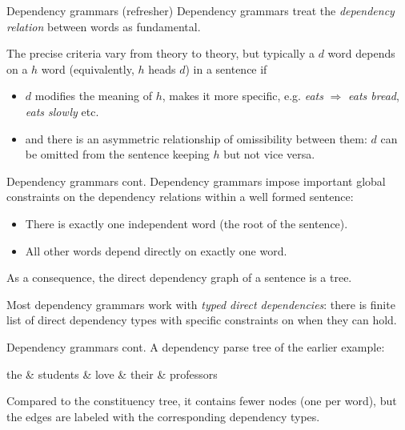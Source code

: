 \documentclass[style=upen, size=14pt]{powerdot}
\newcommand{\gold}{\color{arany}}
\theoremstyle{definition}
\begin{document}
\begin{slide}[toc={Dep. grammars}]{Dependency grammars (refresher)}
  Dependency grammars treat the \emph{\gold dependency relation}
  between words as fundamental.

  The precise criteria vary from theory to theory,
  but typically a $d$ word depends on a $h$ word (equivalently, $h$ heads $d$)
  in a sentence if
  \begin{itemize}
  \item $d$ modifies the meaning of $h$, makes it more specific, e.g.
    \emph{eats} $\Rightarrow$ \emph{eats bread}, \emph{eats slowly} etc.
  \item and there is an asymmetric relationship of omissibility between them:
    $d$ can be omitted from the sentence keeping $h$ but not vice versa.
  \end{itemize}
\end{slide}

\begin{slide}[toc=]{Dependency grammars cont.}
  Dependency grammars impose important global constraints on the dependency
  relations within a well formed sentence:
  
  \begin{itemize}
  \item There is exactly one independent word (the root of the sentence).
  \item All other words depend directly on exactly one word.
  \end{itemize}
  As a consequence, the direct dependency graph of a sentence is a tree.

  Most dependency grammars work with \emph{typed direct dependencies}: there is
  finite list of direct dependency types with specific constraints on when they
  can hold.
\end{slide}


\begin{slide}[toc=]{Dependency grammars cont.}
  A dependency parse tree of the earlier example:
  \begin{center}
    \begin{dependency}[theme=simple, edge style={white}, label style={text=white}]
      \begin{deptext}[column sep=1em, nodes={text=white}]
        the \& students \& love \& their \& professors \\
      \end{deptext}
    \end{dependency}
  \end{center}
  Compared to the constituency tree, it contains fewer nodes (one per word), but
  the edges are labeled with the corresponding dependency types.
\end{slide}
\end{document}
